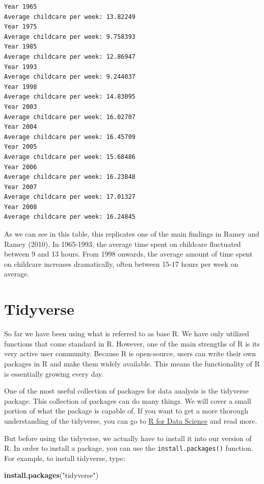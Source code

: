 \documentclass[
]{book}
\newenvironment{Shaded}{\begin{snugshade}}{\end{snugshade}}
\newcommand{\FunctionTok}[1]{\textcolor[rgb]{0.13,0.29,0.53}{\textbf{#1}}}
\newcommand{\NormalTok}[1]{#1}
\newcommand{\StringTok}[1]{\textcolor[rgb]{0.31,0.60,0.02}{#1}}
\begin{document}
\begin{verbatim}
Year 1965 
Average childcare per week: 13.82249 
Year 1975 
Average childcare per week: 9.758393 
Year 1985 
Average childcare per week: 12.86947 
Year 1993 
Average childcare per week: 9.244037 
Year 1998 
Average childcare per week: 14.83095 
Year 2003 
Average childcare per week: 16.02707 
Year 2004 
Average childcare per week: 16.45709 
Year 2005 
Average childcare per week: 15.68486 
Year 2006 
Average childcare per week: 16.23848 
Year 2007 
Average childcare per week: 17.01327 
Year 2008 
Average childcare per week: 16.24845 
\end{verbatim}

As we can see in this table, this replicates one of the main findings in Ramey and Ramey (2010). In 1965-1993, the average time spent on childcare fluctuated between 9 and 13 hours. From 1998 onwards, the average amount of time spent on childcare increases dramatically, often between 15-17 hours per week on average.

\section{Tidyverse}\label{tidyverse}

So far we have been using what is referred to as base R. We have only utilized functions that come standard in R. However, one of the main strengths of R is its very active user community. Because R is open-source, users can write their own packages in R and make them widely available. This means the functionality of R is essentially growing every day.

One of the most useful collection of packages for data analysis is the tidyverse package. This collection of packages can do many things. We will cover a small portion of what the package is capable of. If you want to get a more thorough understanding of the tidyverse, you can go to \href{https://r4ds.had.co.nz/}{R for Data Science} and read more.

But before using the tidyverse, we actually have to install it into our version of R. In order to install a package, you can use the \texttt{install.packages()} function. For example, to install tidyverse, type:

\begin{Shaded}
\begin{Highlighting}[]
\FunctionTok{install.packages}\NormalTok{(}\StringTok{"tidyverse"}\NormalTok{)}
\end{Highlighting}
\end{Shaded}
\end{document}
